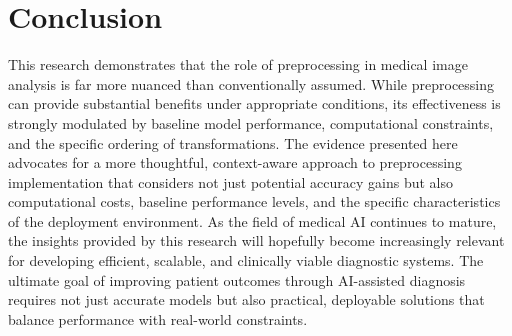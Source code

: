 \documentclass[journal]{IEEEtran}
\begin{document}
\section{Conclusion}

This research demonstrates that the role of preprocessing in medical image analysis is far more nuanced than conventionally assumed. While preprocessing can provide substantial benefits under appropriate conditions, its effectiveness is strongly modulated by baseline model performance, computational constraints, and the specific ordering of transformations. The evidence presented here advocates for a more thoughtful, context-aware approach to preprocessing implementation that considers not just potential accuracy gains but also computational costs, baseline performance levels, and the specific characteristics of the deployment environment. As the field of medical AI continues to mature, the insights provided by this research will hopefully become increasingly relevant for developing efficient, scalable, and clinically viable diagnostic systems. The ultimate goal of improving patient outcomes through AI-assisted diagnosis requires not just accurate models but also practical, deployable solutions that balance performance with real-world constraints.





\balance
\end{document}
